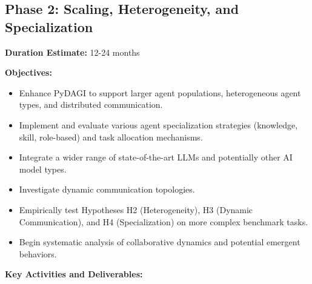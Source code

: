 \documentclass[12pt]{amsart}
\begin{document}
\subsection{Phase 2: Scaling, Heterogeneity, and Specialization}
\label{subsec:phase2}
\textbf{Duration Estimate:} 12-24 months

\textbf{Objectives:}
\begin{itemize}[leftmargin=*]
    \item Enhance PyDAGI to support larger agent populations, heterogeneous agent types, and distributed communication.
    \item Implement and evaluate various agent specialization strategies (knowledge, skill, role-based) and task allocation mechanisms.
    \item Integrate a wider range of state-of-the-art LLMs and potentially other AI model types.
    \item Investigate dynamic communication topologies.
    \item Empirically test Hypotheses H2 (Heterogeneity), H3 (Dynamic Communication), and H4 (Specialization) on more complex benchmark tasks.
    \item Begin systematic analysis of collaborative dynamics and potential emergent behaviors.
\end{itemize}
\textbf{Key Activities and Deliverables:}
\end{document}
